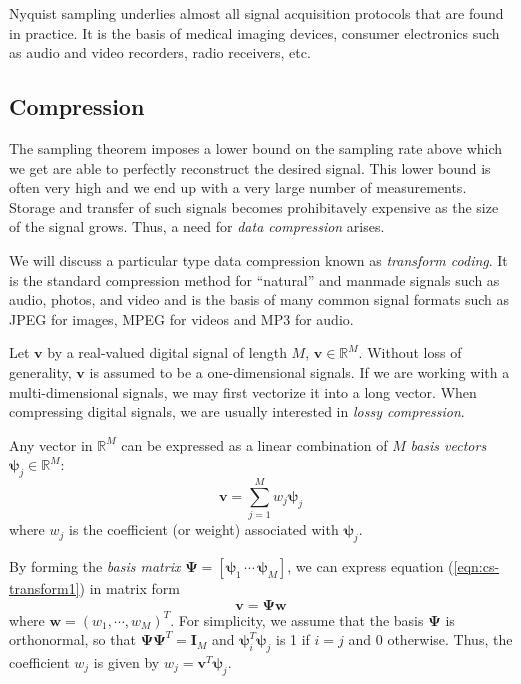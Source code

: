 Nyquist sampling underlies almost all signal acquisition protocols that are found in practice. 
It is the basis of medical imaging devices, consumer electronics such as audio and video recorders, radio receivers, etc.

\subsection{Compression}
\label{sect:compression}
The sampling theorem imposes a lower bound on the sampling rate above which we get are able to perfectly reconstruct the desired signal.
This lower bound is often very high and we end up with a very large number of measurements.
Storage and transfer of such signals becomes prohibitavely expensive as the size of the signal grows.
Thus, a need for \emph{data compression} arises.

We will discuss a particular type data compression known as \emph{transform coding}.
It is the standard compression method for ``natural'' and manmade signals such as audio, photos, and video and is the basis of many common signal formats such as JPEG for images, MPEG for videos and MP3 for audio.

Let $\bm v$ by a real-valued digital signal of length $M$, $\bm v \in \mathbb{R}^M$.
Without loss of generality, $\bm v$ is assumed to be a one-dimensional signals.
If we are working with a multi-dimensional signals, we may first vectorize it into a long vector.
When compressing digital signals, we are usually interested in \emph{lossy compression}.

Any vector in $\mathbb{R}^M$ can be expressed as a linear combination of $M$ \emph{basis vectors} $\bm\psi_j \in \mathbb{R}^M$:
\begin{equation}
\label{eqn:cs-transform1}
  \bm v = \sum_{j=1}^M w_j \bm\psi_j
\end{equation}
where $w_j$ is the coefficient (or weight) associated with $\bm\psi_j$.

By forming the \emph{basis matrix} $\bm\Psi = \left[\bm\psi_1 \,\cdots\, \bm\psi_M\right]$, we can express equation (\ref{eqn:cs-transform1}) in matrix form
\begin{equation*}
\bm v = \bm\Psi \bm w
\end{equation*}
where $\bm w = (w_1,\cdots,w_M)^T$.
For simplicity, we assume that the basis $\bm\Psi$ is orthonormal, so that $\bm\Psi\bm\Psi^T = \bm I_M$ and $\bm\psi_i^T\bm\psi_j$ is 1 if $i = j$ and 0 otherwise.
Thus, the coefficient $w_j$ is given by $w_j = \bm v^T\bm\psi_j$.

